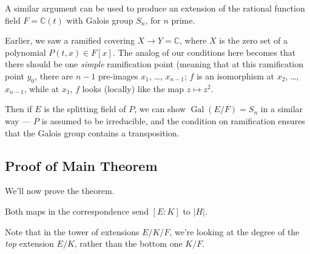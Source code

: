 \begin{note}
    A similar argument can be used to produce an extension of the rational function field $F = \mathbb{C}(t)$ with Galois group $S_n$, for $n$ prime. 
    
    Earlier, we saw a ramified covering $X \to Y = \mathbb{C}$, where $X$ is the zero set of a polynomial $P(t, x) \in F[x]$. The analog of our conditions here becomes that there should be one \emph{simple} ramification point (meaning that at this ramification point $y_0$, there are $n - 1$ pre-images $x_1$, \ldots, $x_{n - 1}$; $f$ is an isomorphism at $x_2$, \ldots, $x_{n - 1}$, while at $x_1$, $f$ looks (locally) like the map $z \mapsto z^2$. 
    
    Then if $E$ is the splitting field of $P$, we can show $\operatorname{Gal}(E/F) = S_n$ in a similar way --- $P$ is assumed to be irreducible, and the condition on ramification ensures that the Galois group contains a transposition.
\end{note}

\subsection{Proof of Main Theorem}

We'll now prove the theorem. 

\begin{lemma}
Both maps in the correspondence send $[E : K]$ to $\lvert H \rvert$. 
\end{lemma}

Note that in the tower of extensions $E/K/F$, we're looking at the degree of the \emph{top} extension $E/K$, rather than the bottom one $K/F$.

